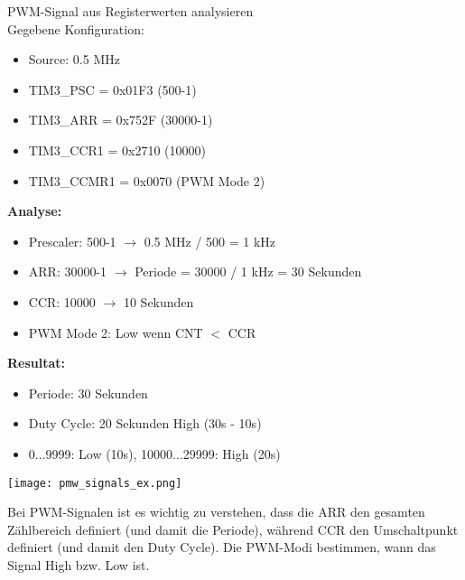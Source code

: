 \begin{example2}{PWM-Signal aus Registerwerten analysieren}\\
    Gegebene Konfiguration:
    \begin{itemize}
        \item Source: 0.5 MHz
        \item TIM3\_PSC = 0x01F3 (500-1)
        \item TIM3\_ARR = 0x752F (30000-1)
        \item TIM3\_CCR1 = 0x2710 (10000)
        \item TIM3\_CCMR1 = 0x0070 (PWM Mode 2)
    \end{itemize}
    
    \tcblower
    
    \textbf{Analyse:}
    \begin{itemize}
        \item Prescaler: 500-1 $\rightarrow$ 0.5 MHz / 500 = 1 kHz
        \item ARR: 30000-1 $\rightarrow$ Periode = 30000 / 1 kHz = 30 Sekunden
        \item CCR: 10000 $\rightarrow$ 10 Sekunden
        \item PWM Mode 2: Low wenn CNT $<$ CCR
    \end{itemize}
    
    \textbf{Resultat:}
    \begin{itemize}
        \item Periode: 30 Sekunden
        \item Duty Cycle: 20 Sekunden High (30s - 10s)
        \item 0...9999: Low (10s), 10000...29999: High (20s)
    \end{itemize}
    \texttt{[image: pmw\_signals\_ex.png]}
\end{example2}

\begin{remark}
    Bei PWM-Signalen ist es wichtig zu verstehen, dass die ARR den gesamten Zählbereich definiert (und damit die Periode), während CCR den Umschaltpunkt definiert (und damit den Duty Cycle). Die PWM-Modi bestimmen, wann das Signal High bzw. Low ist.
\end{remark}